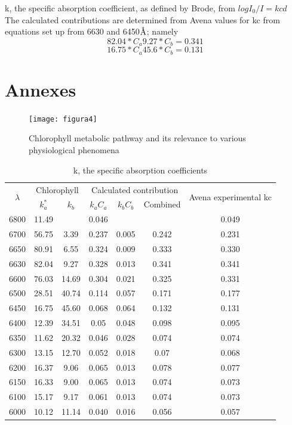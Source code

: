 \documentclass[a4paper, twocolumn, 11pt]{article}
\begin{document}
	k, the specific absorption coefficient, as defined by Brode\cite{Brodc1939}, from $logI_0/I=kcd$\\
	
	The calculated contributions are determined from Avena values for kc from equations set up from 6630 and 6450$\textup{\r{A}}$; namely
	\begin{equation}
	82.04*C_a9.27*C_b=0.341
	\end{equation}
	\begin{equation}
	16.75*C_a45.6*C_b=0.131
	\end{equation}
	\cite{Mackinney}
	




\onecolumn
\section{Annexes}
\begin{figure}[htb]
	\centering
	\texttt{[image: figura4]}
	\caption{Chlorophyll metabolic pathway and its relevance to various physiological phenomena \cite{Tanaka2006}} 
	\label{fig1}
\end{figure}

\begin{table}[htb]
	\begin{longtable}{|c|c|c|c|c|c|c|}
		\hline
		\multirow{2}{*}{$\lambda$} & 
		\multicolumn{2}{c}{Chlorophyll} \vline & 
		\multicolumn{3}{c}{Calculated contribution} \vline & 
		\multirow{2}{*}{Avena experimental kc} \\ \cline{2-6}
		& $k_a^*$ & $k_b$ & $k_aC_a$ & $k_bC_b$ & Combined & \\ \hline
		6800 & 11.49 & & 0.046 & & & 0.049 \\
		6700 & 56.75 & 3.39 & 0.237 & 0.005 & 0.242 & 0.231\\
		6650 & 80.91 & 6.55 & 0.324 & 0.009 & 0.333 & 0.330\\
		6630 & 82.04 & 9.27 & 0.328 & 0.013 & 0.341 & 0.341\\
		6600 & 76.03 & 14.69 & 0.304 & 0.021 & 0.325 & 0.331\\
		6500 & 28.51 & 40.74 & 0.114 & 0.057 & 0.171 &0.177\\
		6450 & 16.75 & 45.60 & 0.068 & 0.064 & 0.132 & 0.131\\
		6400 & 12.39 & 34.51 &0.05 & 0.048 & 0.098 & 0.095\\
		6350 & 11.62 & 20.32 & 0.046 & 0.028 & 0.074 & 0.074\\
		6300 & 13.15 & 12.70 & 0.052 & 0.018 & 0.07 &0.068\\
		6200 & 16.37 & 9.06 & 0.065 & 0.013 &0.078 & 0.077\\
		6150 & 16.33 &9.00 &0.065 & 0.013 & 0.074 & 0.073\\
		6100 & 15.17 & 9.17 & 0.061 & 0.013 & 0.074 & 0.073\\
		6000 & 10.12 & 11.14 & 0.040 & 0.016 & 0.056 & 0.057\\\hline
	\end{longtable}
	\caption{k, the specific absorption coefficients \cite{Mackinney}}
	\label{table1}
\end{table}
\end{document}
